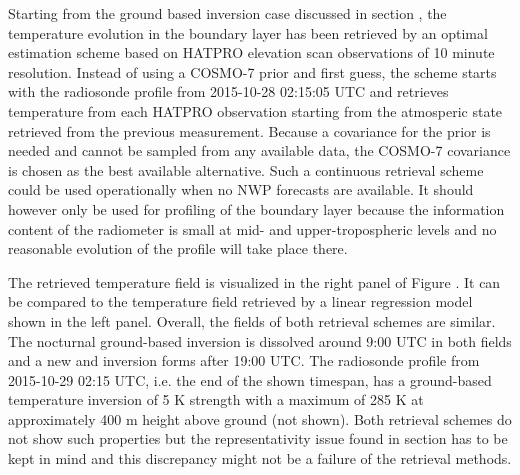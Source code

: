 \stopsubsection

\startsubsection[title={Boundary Layer Evolution}]

    Starting from the ground based inversion case discussed in section
    \in[ch_gbinv], the temperature evolution in the boundary layer has been
    retrieved by an optimal estimation scheme based on HATPRO elevation scan
    observations of 10 minute resolution. Instead of using a COSMO-7 prior
    and first guess, the scheme starts with the radiosonde profile from
    2015-10-28 02:15:05 UTC and retrieves temperature from each HATPRO
    observation starting from the atmosperic state retrieved from the previous
    measurement. Because a covariance for the prior is needed and cannot be
    sampled from any available data, the COSMO-7 covariance is chosen as the
    best available alternative. Such a continuous retrieval scheme could be
    used operationally when no NWP forecasts are available. It should however
    only be used for profiling of the boundary layer because the information
    content of the radiometer is small at mid- and upper-tropospheric levels
    and no reasonable evolution of the profile will take place there.

    The retrieved temperature field is visualized in the right panel of Figure
    . It can be compared to the temperature field
    retrieved by a linear regression model shown in the left panel. Overall,
    the fields of both retrieval schemes are similar. The nocturnal
    ground-based inversion is dissolved around 9:00 UTC in both fields and
    a new and inversion forms after 19:00 UTC. The radiosonde profile from
    2015-10-29 02:15 UTC, i.e. the end of the shown timespan, has
    a ground-based temperature inversion of 5 K strength with a maximum of 285
    K at approximately 400 m height above ground (not shown). Both retrieval
    schemes do not show such properties but the representativity issue
    found in section \in[ch:hatproeval] has to be kept in mind and this
    discrepancy might not be a failure of the retrieval methods.

        {}

